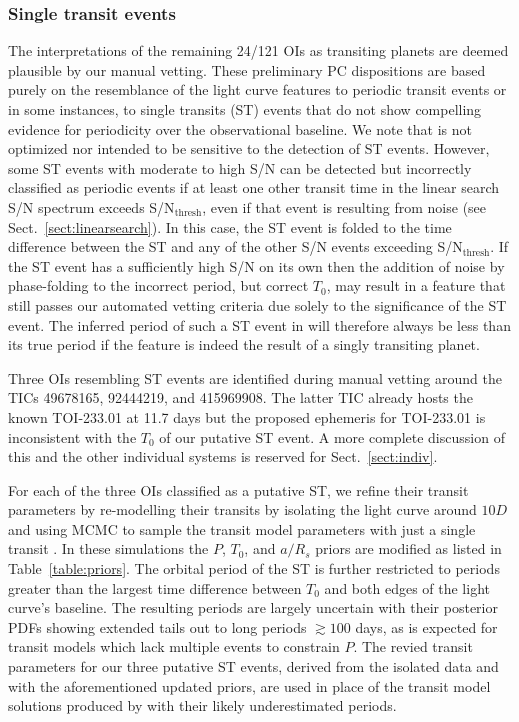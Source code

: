 \subsubsection{Single transit events} \label{sect:ste}
The interpretations of the remaining 24/121 OIs as transiting planets
are deemed plausible by our manual vetting. These preliminary PC dispositions are based purely on the
resemblance of the light curve features to periodic transit events or in some instances, to single
transits (ST) events that do not show compelling evidence for periodicity over the observational baseline.
We note that \pipeline{} is not optimized nor intended to be sensitive to the detection of ST
events. However, some ST events with moderate to high S/N can be detected but incorrectly classified as
periodic events if at least one other transit time in the linear search S/N spectrum exceeds
S/N$_{\text{thresh}}$, even if that event is resulting from noise (see Sect.~\ref{sect:linearsearch}).
In this case, the ST event is folded to the time difference between the ST and any of the other S/N
events exceeding S/N$_{\text{thresh}}$. If the ST event has a sufficiently high S/N on its own
then the addition of noise by phase-folding to the incorrect
period, but correct $T_0$, may result in a feature that still passes our automated vetting criteria due solely
to the significance of the ST event. The inferred period of such a ST event in \pipeline{} will therefore
always be less than its true period if the feature is indeed the result of a singly transiting planet.

Three OIs resembling ST events are identified during manual vetting around the TICs 49678165, 92444219,
and 415969908. The latter TIC already hosts the known TOI-233.01 at 11.7 days but the proposed ephemeris for
TOI-233.01 is inconsistent with the $T_0$ of our putative ST event. A more complete discussion of
this and the other individual systems is reserved for Sect.~\ref{sect:indiv}.

For each of the three OIs classified as a putative ST, we refine
their transit parameters by re-modelling their transits by isolating the light curve around $10D$ and
using MCMC to sample the transit model parameters with just a single transit \citep{seager03}. In these
simulations the $P$, $T_0$, and $a/R_s$ priors are modified as listed in Table~\ref{table:priors}.
The orbital period of the ST is further restricted to periods greater than the largest time difference
between $T_0$ and both edges of the light curve's baseline. 
The resulting periods are largely uncertain with their posterior PDFs showing extended tails out to long
periods $\gtrsim 100$ days, as is expected for transit models which lack multiple events to constrain $P$.
The revied transit parameters for our three putative ST events, derived from the isolated data and with
the aforementioned updated priors, are used in place of the transit model solutions
produced by \pipeline{} with their likely underestimated periods.


